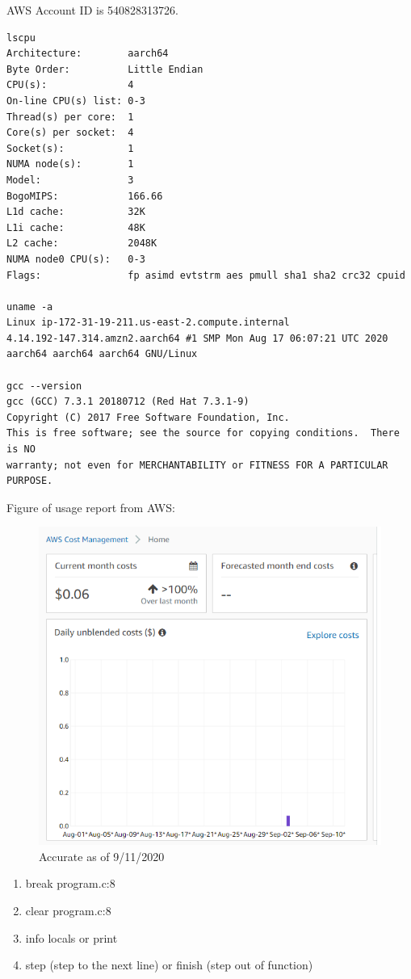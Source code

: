 \documentclass[
  course = {{ESE532 System-on-a-Chip}},
  quartile = {{}},
  assignment = 1,
  name = {{Sheil Sarda}},
  studentnumber = {{}},
  email = {{sheils@seas.upenn.edu}},
  firstexercise = 1
]{aga-homework}
\begin{document}
\exercise

\subexercise AWS Account ID is 540828313726.
\subexercise 
\begin{verbatim}
lscpu
Architecture:        aarch64
Byte Order:          Little Endian
CPU(s):              4
On-line CPU(s) list: 0-3
Thread(s) per core:  1
Core(s) per socket:  4
Socket(s):           1
NUMA node(s):        1
Model:               3
BogoMIPS:            166.66
L1d cache:           32K
L1i cache:           48K
L2 cache:            2048K
NUMA node0 CPU(s):   0-3
Flags:               fp asimd evtstrm aes pmull sha1 sha2 crc32 cpuid

uname -a
Linux ip-172-31-19-211.us-east-2.compute.internal 
4.14.192-147.314.amzn2.aarch64 #1 SMP Mon Aug 17 06:07:21 UTC 2020 
aarch64 aarch64 aarch64 GNU/Linux

gcc --version
gcc (GCC) 7.3.1 20180712 (Red Hat 7.3.1-9)
Copyright (C) 2017 Free Software Foundation, Inc.
This is free software; see the source for copying conditions.  There is NO
warranty; not even for MERCHANTABILITY or FITNESS FOR A PARTICULAR PURPOSE.
\end{verbatim}

\subexercise Figure of usage report from AWS:
\begin{figure}
	\centering
	\includegraphics[width=0.7\linewidth]{figures/usage_report}
	\caption{Accurate as of 9/11/2020}
	\label{fig:usagereport}
\end{figure}

\newpage

\subexercise

\renewcommand{\theenumi}{\roman{enumi}}%
\begin{enumerate}
	\item break program.c:8
	\item clear program.c:8
	\item info locals or print
	\item step (step to the next line) or finish (step out of function)
\end{enumerate}
\end{document}
